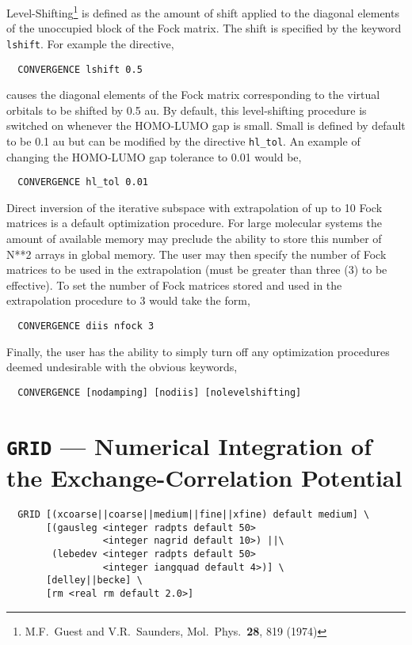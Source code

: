 Level-Shifting\footnote {M.F.~Guest and 
V.R.~Saunders, Mol.~Phys.~{\bf 28}, 819 (1974)} is defined as the
amount of shift applied to the diagonal elements of the unoccupied
block of the Fock matrix.  The shift is specified by the
keyword \verb+lshift+.  For example the directive,
\begin{verbatim}
  CONVERGENCE lshift 0.5
\end{verbatim}
causes the diagonal elements of the Fock matrix
corresponding to the virtual orbitals to be shifted by 0.5 au.
By default, this level-shifting procedure is switched on whenever the
HOMO-LUMO gap is small.  Small is defined by default to be 0.1 au but
can be modified by the directive \verb+hl_tol+.  An example of
changing the HOMO-LUMO gap tolerance to 0.01 would be,
\begin{verbatim}
  CONVERGENCE hl_tol 0.01
\end{verbatim}

Direct inversion of the iterative subspace with extrapolation of up to
10 Fock matrices is a default optimization procedure.  For large
molecular systems the amount of available memory may preclude the ability to
store this number of N**2 arrays in global memory.  The user may then
specify the number of Fock matrices to be used in the extrapolation
(must be greater than three (3) to be effective).  To set the number of
Fock matrices stored and used in the extrapolation procedure to 3
would take the form,
\begin{verbatim}
  CONVERGENCE diis nfock 3
\end{verbatim}

Finally, the user has the ability to simply turn off any optimization
procedures deemed undesirable with the obvious keywords,
\begin{verbatim}
  CONVERGENCE [nodamping] [nodiis] [nolevelshifting]
\end{verbatim}


\section{{\tt GRID} --- Numerical Integration of the Exchange-Correlation Potential}

\begin{verbatim}
  GRID [(xcoarse||coarse||medium||fine||xfine) default medium] \
       [(gausleg <integer radpts default 50> 
                 <integer nagrid default 10>) ||\ 
        (lebedev <integer radpts default 50> 
                 <integer iangquad default 4>)] \ 
       [delley||becke] \
       [rm <real rm default 2.0>]
\end{verbatim}

